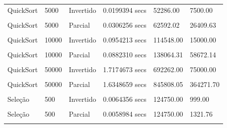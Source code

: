 \documentclass[
]{article}
\begin{document}
\begin{longtable}[l]{llllll}
QuickSort & 5000 & Invertido & 0.0199394 secs & 52286.00 & 7500.00\\
\cellcolor{gray!15}{QuickSort} & \cellcolor{gray!15}{5000} & \cellcolor{gray!15}{Ordenado} & \cellcolor{gray!15}{0.0200574 secs} & \cellcolor{gray!15}{54774.00} & \cellcolor{gray!15}{0.00}\\
QuickSort & 5000 & Parcial & 0.0306256 secs & 62592.02 & 26409.63\\
\cellcolor{gray!15}{QuickSort} & \cellcolor{gray!15}{10000} & \cellcolor{gray!15}{Aleatório} & \cellcolor{gray!15}{0.0971727 secs} & \cellcolor{gray!15}{143824.18} & \cellcolor{gray!15}{92592.51}\\
QuickSort & 10000 & Invertido & 0.0954213 secs & 114548.00 & 15000.00\\
\cellcolor{gray!15}{QuickSort} & \cellcolor{gray!15}{10000} & \cellcolor{gray!15}{Ordenado} & \cellcolor{gray!15}{0.0973439 secs} & \cellcolor{gray!15}{119535.00} & \cellcolor{gray!15}{0.00}\\
QuickSort & 10000 & Parcial & 0.0882310 secs & 138064.31 & 58672.14\\
\cellcolor{gray!15}{QuickSort} & \cellcolor{gray!15}{50000} & \cellcolor{gray!15}{Aleatório} & \cellcolor{gray!15}{1.7015193 secs} & \cellcolor{gray!15}{848051.17} & \cellcolor{gray!15}{543859.65}\\
QuickSort & 50000 & Invertido & 1.7174673 secs & 692262.00 & 75000.00\\
\cellcolor{gray!15}{QuickSort} & \cellcolor{gray!15}{50000} & \cellcolor{gray!15}{Ordenado} & \cellcolor{gray!15}{1.7960176 secs} & \cellcolor{gray!15}{717248.00} & \cellcolor{gray!15}{0.00}\\
QuickSort & 50000 & Parcial & 1.6348659 secs & 845808.05 & 364271.70\\
\cellcolor{gray!15}{Seleção} & \cellcolor{gray!15}{500} & \cellcolor{gray!15}{Aleatório} & \cellcolor{gray!15}{0.0060219 secs} & \cellcolor{gray!15}{124750.00} & \cellcolor{gray!15}{1485.98}\\
Seleção & 500 & Invertido & 0.0064356 secs & 124750.00 & 999.00\\
\cellcolor{gray!15}{Seleção} & \cellcolor{gray!15}{500} & \cellcolor{gray!15}{Ordenado} & \cellcolor{gray!15}{0.0070200 secs} & \cellcolor{gray!15}{124750.00} & \cellcolor{gray!15}{499.00}\\
Seleção & 500 & Parcial & 0.0058984 secs & 124750.00 & 1321.76\\
\cellcolor{gray!15}{Seleção} & \cellcolor{gray!15}{1000} & \cellcolor{gray!15}{Aleatório} & \cellcolor{gray!15}{0.0241992 secs} & \cellcolor{gray!15}{499500.00} & \cellcolor{gray!15}{2984.90}\\

\end{longtable}
\end{document}
